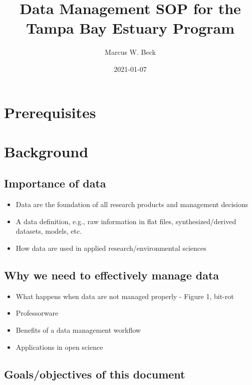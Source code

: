 \documentclass[
]{book}
\title{Data Management SOP for the Tampa Bay Estuary Program}
\author{Marcus W. Beck}
\date{2021-01-07}
\providecommand{\tightlist}{%
  \setlength{\itemsep}{0pt}\setlength{\parskip}{0pt}}
\begin{document}
\maketitle

{
\setcounter{tocdepth}{1}
\tableofcontents
}
\hypertarget{prerequisites}{%
\chapter{Prerequisites}\label{prerequisites}}

\hypertarget{background}{%
\chapter{Background}\label{background}}

\hypertarget{importance-of-data}{%
\section{Importance of data}\label{importance-of-data}}

\begin{itemize}
\tightlist
\item
  Data are the foundation of all research products and management decisions
\item
  A data definition, e.g., raw information in flat files, synthesized/derived datasets, models, etc.
\item
  How data are used in applied research/environmental sciences
\end{itemize}

\hypertarget{why-we-need-to-effectively-manage-data}{%
\section{Why we need to effectively manage data}\label{why-we-need-to-effectively-manage-data}}

\begin{itemize}
\tightlist
\item
  What happens when data are not managed properly - Figure 1, bit-rot
\item
  Professorware
\item
  Benefits of a data management workflow
\item
  Applications in open science
\end{itemize}

\hypertarget{goalsobjectives-of-this-document}{%
\section{Goals/objectives of this document}\label{goalsobjectives-of-this-document}}
\end{document}

